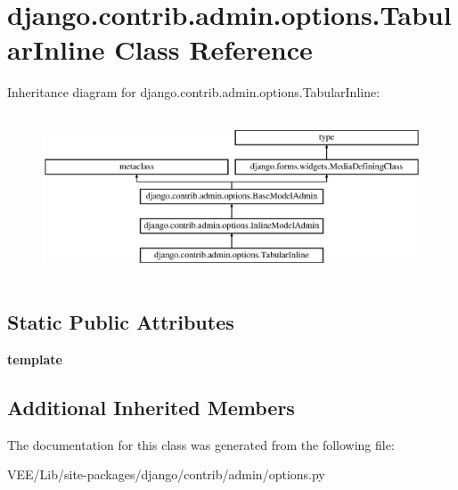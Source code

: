 \hypertarget{classdjango_1_1contrib_1_1admin_1_1options_1_1_tabular_inline}{}\section{django.\+contrib.\+admin.\+options.\+Tabular\+Inline Class Reference}
\label{classdjango_1_1contrib_1_1admin_1_1options_1_1_tabular_inline}
Inheritance diagram for django.\+contrib.\+admin.\+options.\+Tabular\+Inline\+:\begin{figure}[H]
\begin{center}
\leavevmode
\includegraphics[height=4.895105cm]{classdjango_1_1contrib_1_1admin_1_1options_1_1_tabular_inline}
\end{center}
\end{figure}
\subsection*{Static Public Attributes}
\begin{DoxyCompactItemize}
\item 
\mbox{\label{classdjango_1_1contrib_1_1admin_1_1options_1_1_tabular_inline_a74e2356d36c10e1d874695cc8f4b1d92}} 
{\bfseries template}
\end{DoxyCompactItemize}
\subsection*{Additional Inherited Members}


The documentation for this class was generated from the following file\+:\begin{DoxyCompactItemize}
\item 
V\+E\+E/\+Lib/site-\/packages/django/contrib/admin/options.\+py\end{DoxyCompactItemize}
